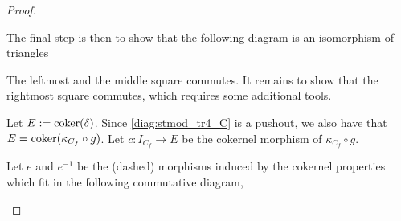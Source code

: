 \begin{proof}
\begin{enumerate}[label={(\bfseries TR\arabic*)}]
{            The final step is then to show that the following diagram is an isomorphism of triangles
            \begin{center}
            \end{center}

            The leftmost and the middle square commutes. It remains to show that the rightmost square commutes, which requires some additional tools.

            Let \( E := \operatorname{coker}(\delta)\). Since \autoref{diag:stmod_tr4_C} is a pushout, we also have that \( E = \operatorname{coker}(\kappa_{C_f} \circ g) \). Let \( c: I_{C_f} \to E \) be the cokernel morphism of \( \kappa_{C_f} \circ g \).

            Let \( e \) and \( e^{-1} \) be the (dashed) morphisms induced by the cokernel properties which fit in the following commutative diagram,
            \begin{center}
\end{center}}
\end{enumerate}
\end{proof}
